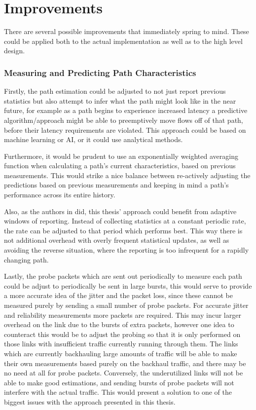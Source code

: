 \section{Improvements}

There are several possible improvements that immediately spring to mind. These could be applied both to the actual implementation as well as to the high level design.

\subsubsection{Measuring and Predicting Path Characteristics}
Firstly, the path estimation could be adjusted to not just report previous statistics but also attempt to infer what the path might look like in the near future, for example as a path begins to experience increased latency a predictive algorithm/approach might be able to preemptively move flows off of that path, before their latency requirements are violated. This approach could be based on machine learning or AI, or it could use analytical methods.

Furthermore, it would be prudent to use an exponentially weighted averaging function when calculating a path's current characteristics, based on previous measurements. This would strike a nice balance between re-actively adjusting the predictions based on previous measurements and keeping in mind a path's performance across its entire history.

Also, as the authors in \cite{adaptive} did, this thesis' approach could benefit from adaptive windows of reporting. Instead of collecting statistics at a constant periodic rate, the rate can be adjusted to that period which performs best. This way there is not additional overhead with overly frequent statistical updates, as well as avoiding the reverse situation, where the reporting is too infrequent for a rapidly changing path.

Lastly, the probe packets which are sent out periodically to measure each path could be adjust to periodically be sent in large bursts, this would serve to provide a more accurate idea of the jitter and the packet loss, since these cannot be measured purely by sending a small number of probe packets. For accurate jitter and reliability measurements more packets are required. This may incur larger overhead on the link due to the bursts of extra packets, however one idea to counteract this would be to adjust the probing so that it is only performed on those links with insufficient traffic currently running through them. The links which are currently backhauling large amounts of traffic will be able to make their own measurements based purely on the backhaul traffic, and there may be no need at all for probe packets. Conversely, the underutilized links will not be able to make good estimations, and sending bursts of probe packets will not interfere with the actual traffic. This would present a solution to one of the biggest issues with the approach presented in this thesis.

